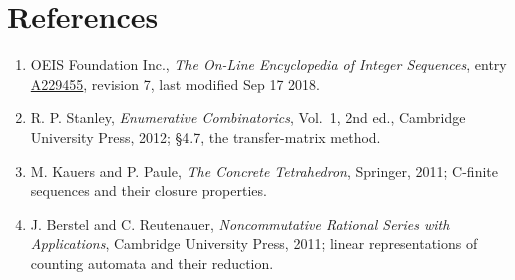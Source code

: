 \documentclass[11pt]{article}
\theoremstyle{definition}
\begin{document}
\section{References}

\begin{enumerate}

\item OEIS Foundation Inc., \emph{The On-Line Encyclopedia of Integer Sequences}, entry \href{https://oeis.org/A229455}{A229455}, revision 7, last modified Sep 17 2018.

\item R. P. Stanley, \emph{Enumerative Combinatorics}, Vol.~1, 2nd ed., Cambridge University Press, 2012; \S4.7, the transfer-matrix method.

\item M. Kauers and P. Paule, \emph{The Concrete Tetrahedron}, Springer, 2011; C-finite sequences and their closure properties.

\item J. Berstel and C. Reutenauer, \emph{Noncommutative Rational Series with Applications}, Cambridge University Press, 2011; linear representations of counting automata and their reduction.

\end{enumerate}
\end{document}
